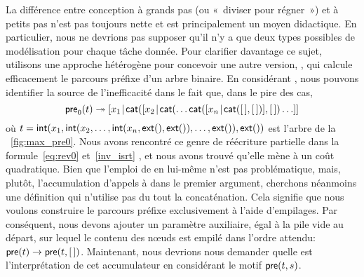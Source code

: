 La différence entre conception à grands pas (ou «~diviser pour régner~») et à
petits pas n'est pas toujours nette et
est principalement un moyen didactique. En particulier, nous ne
devrions pas supposer qu'il n'y a que deux types possibles de
modélisation pour chaque tâche donnée. Pour clarifier davantage ce
sujet, utilisons une approche hétérogène pour concevoir une autre
version, , qui calcule efficacement
le parcours préfixe d'un arbre binaire. En considérant
, nous pouvons
identifier la source de l'inefficacité dans le fait que, dans le pire
des cas,
\begin{equation*}
\fun{pre}_0(t) \twoheadrightarrow
\cons{x_1}{\fun{cat}(\cons{x_2}{\fun{cat}(\dots
    \fun{cat}(\cons{x_n}{\fun{cat}(\el, \el)},\el) \dots}}
\index{cat@\fun{cat/2}}
\end{equation*}
où \(t = \textsf{int}(x_1,\textsf{int}(x_2,\dots, \textsf{int}(x_n,
\textsf{ext}(), \textsf{ext}()), \dots, \textsf{ext}()),\textsf{ext}())\) est
l'arbre de la \fig~\vref{fig:max_pre0}. Nous avons rencontré ce genre
de réécriture partielle dans la
formule~\eqref{eq:rev0}
 et~\eqref{inv_isrt}
,
et nous avons trouvé qu'elle mène à un coût quadratique. Bien que
l'emploi de  en lui-même n'est pas
problématique, mais, plutôt, l'accumulation d'appels à
 dans le premier argument, cherchons
néanmoins une définition qui n'utilise pas du tout la concaténation.
Cela signifie que nous voulons construire le parcours préfixe
exclusivement à l'aide d'empilages. Par conséquent, nous devons
ajouter un paramètre auxiliaire, égal à la pile vide au départ, sur
lequel le contenu des nœuds est empilé dans l'ordre attendu:
\(\textsf{pre}(t) \rightarrow \textsf{pre}(t,[\,])\).
Maintenant, nous devrions nous demander quelle est l'interprétation de
cet accumulateur en
considérant le motif \(\textsf{pre}(t,s)\).

